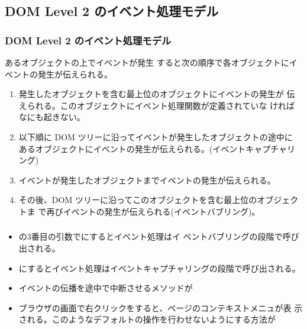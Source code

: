 \subsection{DOM Level 2 のイベント処理モデル}
\begin{frame}[containsverbatim]
\frametitle{DOM Level 2 のイベント処理モデル}
あるオブジェクトの上でイベントが発生
すると次の順序で各オブジェクトにイベントの発生が伝えられる。
\begin{enumerate}
 \item 発生したオブジェクトを含む最上位のオブジェクトにイベントの発生が
       伝えられる。このオブジェクトにイベント処理関数が定義されていな
       ければなにも起きない。
 \item 以下順に DOM ツリーに沿ってイベントが発生したオブジェクトの途中に
       あるオブジェクトにイベントの発生が伝えられる。(イベントキャプチャリング)
 \item イベントが発生したオブジェクトまでイベントの発生が伝えられる。
 \item その後、DOM ツリーに沿ってこのオブジェクトを含む最上位のオブジェクトま
       で再びイベントの発生が伝えられる(イベントバブリング)。
\end{enumerate}
\end{frame}
\begin{frame}[containsverbatim]
\frametitle{}
\begin{itemize}
 \item {}の3番目の引数でにするとイベント処理はイ
ベントバブリングの段階で呼び出される。
 \item {}にするとイベント処理はイベントキャプチャリングの段階で呼び出される。
 \item イベントの伝播を途中で中断させるメソッドが
 \item ブラウザの画面で右クリックをすると、ページのコンテキストメニュが表
示される。このようなデフォルトの操作を行わせないようにする方法が
\end{itemize}
\end{frame}
